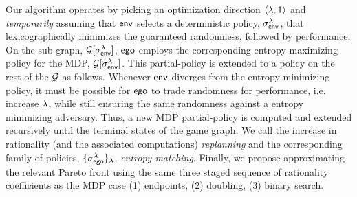 Our algorithm operates by picking an optimization direction
$\langle \lambda, 1 \rangle$ and \emph{temporarily} assuming that $\mathsf{env}$
selects a deterministic policy, $\sigma^\lambda_{\mathsf{env}}$, that
lexicographically minimizes the guaranteed randomness, followed by
performance. On the sub-graph, $\mathcal{G}[\sigma^\lambda_{\mathsf{env}}]$, $\mathsf{ego}$
employs the corresponding entropy maximizing policy for the MDP,
$\mathcal{G}[\sigma^\lambda_{\mathsf{env}}]$. This partial-policy is extended to a policy
on the rest of the $\mathcal{G}$ as follows. Whenever $\mathsf{env}$ diverges from
the entropy minimizing policy, it must be possible for $\mathsf{ego}$ to
trade randomness for performance, i.e. increase $\lambda$, while still
ensuring the same randomness against a entropy minimizing
adversary. Thus, a new MDP partial-policy is computed and extended
recursively until the terminal states of the game graph.  We call the increase
in rationality (and the associated computations) \emph{replanning} and
the corresponding family of policies, $\{\sigma^\lambda_{\mathsf{ego}}\}_\lambda$,
\emph{entropy matching}.  Finally, we propose approximating the
relevant Pareto front using the same three staged sequence of
rationality coefficients as the MDP case (1) endpoints, (2) doubling,
(3) binary search.

